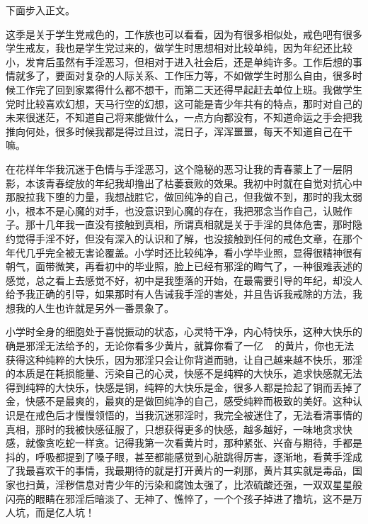 下面步入正文。

这季是关于学生党戒色的，工作族也可以看看，因为有很多相似处，戒色吧有很多学生戒友，我也是学生党过来的，做学生时思想相对比较单纯，因为年纪还比较小，发育后虽然有手淫恶习，但相对于进入社会后，还是单纯许多。工作后想的事情就多了，要面对复杂的人际关系、工作压力等，不如做学生时那么自由，很多时候工作完了回到家累得什么都不想干，而第二天还得早起赶去单位上班。我做学生党时比较喜欢幻想，天马行空的幻想，这可能是青少年共有的特点，那时对自己的未来很迷茫，不知道自己将来能做什么，一点方向都没有，不知道命运之手会把我推向何处，很多时候我都是得过且过，混日子，浑浑噩噩，每天不知道自己在干嘛。

在花样年华我沉迷于色情与手淫恶习，这个隐秘的恶习让我的青春蒙上了一层阴影，本该青春绽放的年纪我却撸出了枯萎衰败的效果。我初中时就在自觉对抗心中那股拉我下堕的力量，我想战胜它，做回纯净的自己，但我做不到，那时的我太弱小，根本不是心魔的对手，也没意识到心魔的存在，我把邪念当作自己，认贼作子。那十几年我一直没有接触到真相，所谓真相就是关于手淫的具体危害，那时隐约觉得手淫不好，但没有深入的认识和了解，也没接触到任何的戒色文章，在那个年代几乎完全被无害论覆盖。小学时还比较纯净，看小学毕业照，显得很精神很有朝气，面带微笑，再看初中的毕业照，脸上已经有邪淫的晦气了，一种很难表述的感觉，总之看上去感觉不好，初中是我堕落的开始，在最需要引导的年纪，却没人给予我正确的引导，如果那时有人告诫我手淫的害处，并且告诉我戒除的方法，我想我的人生也许就是另外一番景象了。

小学时全身的细胞处于喜悦振动的状态，心灵特干净，内心特快乐，这种大快乐的确是邪淫无法给予的，无论你看多少黄片，就算你看了一亿 \unit{\giga\byte} 的黄片，你也无法获得这种纯粹的大快乐，因为邪淫只会让你背道而驰，让自己越来越不快乐，邪淫的本质是在耗损能量、污染自己的心灵，快感不是纯粹的大快乐，追求快感就无法得到纯粹的大快乐，快感是铜，纯粹的大快乐是金，很多人都是捡起了铜而丢掉了金，快感不是最爽的，最爽的是做回纯净的自己，感受纯粹而极致的美好。这种认识是在戒色后才慢慢领悟的，当我沉迷邪淫时，我完全被迷住了，无法看清事情的真相，那时的我被快感征服了，只想获得更多的快感，越多越好，一味地贪求快感，就像贪吃蛇一样贪。记得我第一次看黄片时，那种紧张、兴奋与期待，手都是抖的，呼吸都提到了嗓子眼，甚至都能感觉到心脏跳得厉害，逐渐地，看黄手淫成了我最喜欢干的事情，我最期待的就是打开黄片的一刹那，黄片其实就是毒品，国家也扫黄，淫秽信息对青少年的污染和腐蚀太强了，比浓硫酸还强，一双双星星般闪亮的眼睛在邪淫后暗淡了、无神了、憔悴了，一个个孩子掉进了撸坑，这不是万人坑，而是亿人坑！

